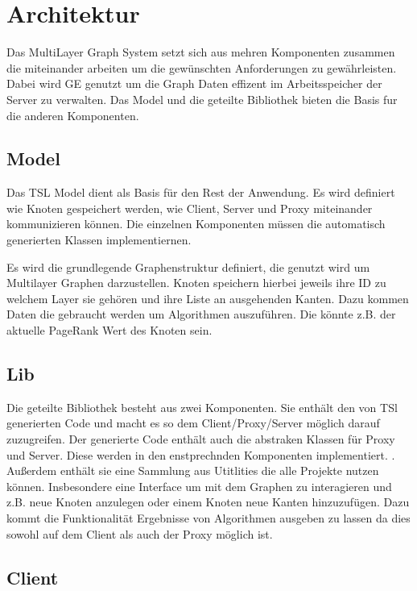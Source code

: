 
\section{Architektur}

Das MultiLayer Graph System setzt sich aus mehren Komponenten zusammen die miteinander arbeiten um die gewünschten Anforderungen zu gewährleisten.
Dabei wird GE genutzt um die Graph Daten effizent im Arbeitsspeicher der Server zu verwalten.  Das Model und die geteilte Bibliothek bieten die Basis fur die
anderen Komponenten.

\subsection{Model}

Das TSL Model dient als Basis für den Rest der Anwendung. Es wird definiert wie Knoten gespeichert werden, wie Client, Server und Proxy miteinander
kommunizieren können. Die einzelnen Komponenten müssen die automatisch generierten Klassen implementiernen.

Es wird die grundlegende Graphenstruktur definiert, die genutzt wird um Multilayer Graphen darzustellen. Knoten speichern hierbei jeweils ihre ID zu welchem Layer sie gehören
und ihre Liste an ausgehenden Kanten. Dazu kommen Daten die gebraucht werden um Algorithmen auszuführen. Die könnte z.B. der aktuelle PageRank Wert des Knoten sein.




\subsection{Lib}

Die geteilte Bibliothek besteht aus zwei Komponenten. Sie enthält den von TSl generierten Code und macht es so dem Client/Proxy/Server möglich darauf zuzugreifen. Der generierte Code enthält auch die abstraken Klassen für Proxy und Server. Diese werden in den enstprechnden Komponenten implementiert. . Außerdem enthält sie
eine Sammlung aus Utitlities die alle Projekte nutzen können. Insbesondere eine Interface um mit dem Graphen zu interagieren und z.B. neue Knoten anzulegen oder einem Knoten neue Kanten hinzuzufügen.
Dazu kommt die Funktionalität Ergebnisse von Algorithmen ausgeben zu lassen da dies sowohl auf dem Client als auch der Proxy möglich ist.


\subsection{Client}


